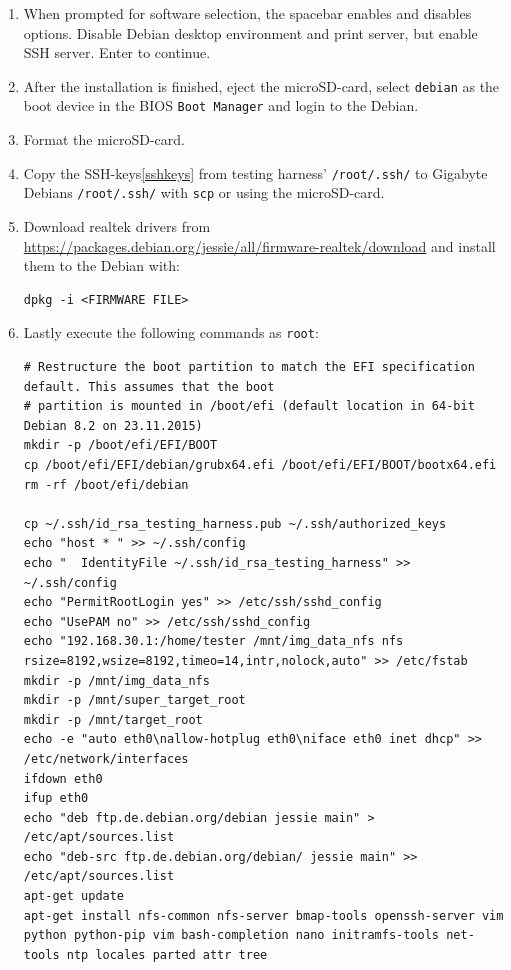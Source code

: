 \documentclass[a4paper,11pt]{article}
\newcommand{\cmd}[1]{\texttt{#1}}
\begin{document}
\begin{enumerate}
\item When prompted for software selection, the spacebar enables and disables options. Disable Debian desktop environment and print server, but enable SSH server. Enter to continue.

\item After the installation is finished, eject the microSD-card, select \cmd{debian} as the boot device in the BIOS \cmd{Boot Manager} and login to the Debian.

\item Format the microSD-card.

\item Copy the SSH-keys\ref{sshkeys} from testing harness' \cmd{/root/.ssh/} to Gigabyte Debians \cmd{/root/.ssh/} with \cmd{scp} or using the microSD-card.

\item Download realtek drivers from \url{https://packages.debian.org/jessie/all/firmware-realtek/download} and install them to the Debian with:

\begin{lstlisting}
dpkg -i <FIRMWARE FILE>
\end{lstlisting}

\item Lastly execute the following commands as \cmd{root}:

\begin{lstlisting}
# Restructure the boot partition to match the EFI specification default. This assumes that the boot 
# partition is mounted in /boot/efi (default location in 64-bit Debian 8.2 on 23.11.2015)
mkdir -p /boot/efi/EFI/BOOT
cp /boot/efi/EFI/debian/grubx64.efi /boot/efi/EFI/BOOT/bootx64.efi
rm -rf /boot/efi/debian

cp ~/.ssh/id_rsa_testing_harness.pub ~/.ssh/authorized_keys
echo "host * " >> ~/.ssh/config
echo "  IdentityFile ~/.ssh/id_rsa_testing_harness" >> ~/.ssh/config
echo "PermitRootLogin yes" >> /etc/ssh/sshd_config
echo "UsePAM no" >> /etc/ssh/sshd_config
echo "192.168.30.1:/home/tester /mnt/img_data_nfs nfs	rsize=8192,wsize=8192,timeo=14,intr,nolock,auto" >> /etc/fstab
mkdir -p /mnt/img_data_nfs
mkdir -p /mnt/super_target_root
mkdir -p /mnt/target_root
echo -e "auto eth0\nallow-hotplug eth0\niface eth0 inet dhcp" >> /etc/network/interfaces
ifdown eth0
ifup eth0
echo "deb ftp.de.debian.org/debian jessie main" > /etc/apt/sources.list
echo "deb-src ftp.de.debian.org/debian/ jessie main" >> /etc/apt/sources.list
apt-get update
apt-get install nfs-common nfs-server bmap-tools openssh-server vim python python-pip vim bash-completion nano initramfs-tools net-tools ntp locales parted attr tree
\end{lstlisting}


\end{enumerate}
\end{document}
